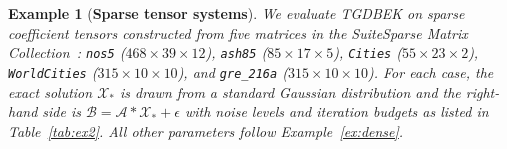 \documentclass[11pt]{article}
\newtheorem{example}[theorem]{Example}
\def\fm#1{\mathcal{#1}}
\begin{document}
\begin{example}[\textbf{Sparse tensor systems}] \label{ex:sparse}
We evaluate TGDBEK on sparse coefficient tensors constructed from five matrices in the SuiteSparse Matrix Collection~\cite{suiteSparse}: \texttt{nos5} ($468\times39\times12$), \texttt{ash85} ($85\times17\times5$), \texttt{Cities} ($55\times23\times2$), \texttt{WorldCities} ($315\times10\times10$), and \texttt{gre\_216a} ($315\times10\times10$). For each case, the exact solution $\fm X_\ast$ is drawn from a standard Gaussian distribution and the right-hand side is $\fm B = \fm A * \fm X_\ast + \fm\epsilon$ with noise levels and iteration budgets as listed in Table~\ref{tab:ex2}. All other parameters follow Example~\ref{ex:dense}.


\end{example}
\end{document}
